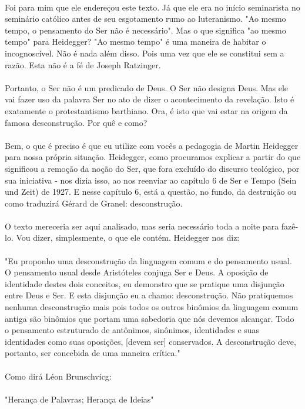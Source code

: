 \documentclass[10pt,a4paper]{book}
\begin{document}
	\\
	Foi para mim que ele endereçou este texto. Já que ele era no início seminarista no seminário católico antes de seu esgotamento rumo ao luteranismo. "Ao mesmo tempo, o pensamento do Ser não é necessário". Mas o que significa "ao mesmo tempo" para Heidegger? "Ao mesmo tempo" é uma maneira de habitar o incognoscível. Não é nada além disso. Pois uma vez que ele se constitui sem a razão. Esta não é a fé de Joseph Ratzinger.\\
	\\
	Portanto, o Ser não é um predicado de Deus. O Ser não designa Deus. Mas ele vai fazer uso da palavra Ser no ato de dizer o acontecimento da revelação. Isto é exatamente o protestantismo barthiano. Ora, é isto que vai estar na origem da famosa desconstrução. Por quê e como?\\
	\\
	Bem, o que é preciso é que eu utilize com vocês a pedagogia de Martin Heidegger para nossa própria situação. Heidegger, como procuramos explicar a partir do que significou a remoção da noção do Ser, que fora excluído do discurso teológico, por sua iniciativa - nos dizia isso, ao nos reenviar ao capítulo 6 de Ser e Tempo (Sein und Zeit) de 1927. E nesse capítulo 6, está a questão, no fundo, da destruição ou como traduzirá Gérard de Granel: desconstrução.\\
	\\
	O texto mereceria ser aqui analisado, mas seria necessário toda a noite para fazê-lo. Vou dizer, simplesmente, o que ele contém. Heidegger nos diz:\\
	\\
	"Eu proponho uma desconstrução da linguagem comum e do pensamento usual. O pensamento usual desde Aristóteles conjuga Ser e Deus. A oposição de identidade destes dois conceitos, eu demonstro que se pratique uma disjunção entre Deus e Ser. E esta disjunção eu a chamo: desconstrução. Não pratiquemos nenhuma desconstrução mais pois todos os outros binômios da linguagem comum antiga são binômios que portam uma sabedoria que nós devemos alcançar. Todo o pensamento estruturado de antônimos, sinônimos, identidades e suas identidades como suas oposições,  [devem ser] conservados. A desconstrução deve, portanto, ser concebida de uma maneira crítica."\\
	\\
	Como dirá Léon Brunschvicg:\\
	\\
	"Herança de Palavras; Herança de Ideias" \\
\end{document}
